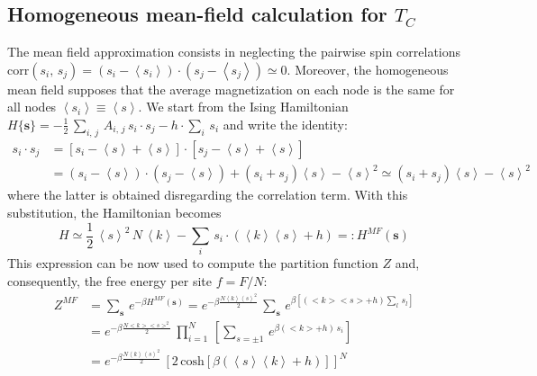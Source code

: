 \subsection*{Homogeneous mean-field calculation for $T_C$ } \label{app:mean_field}
{\small
The mean field approximation consists in neglecting the pairwise spin correlations $
    \text{corr}(s_i,\,s_j) = (s_i - \left\langle s_i \right \rangle)\cdot (s_j - \left\langle s_j \right \rangle)\simeq 0 $.
Moreover, the homogeneous mean field supposes that the average magnetization on each node is the same for all nodes $\left\langle s_i\right\rangle \equiv \left \langle s \right \rangle$. We start from the Ising Hamiltonian $H\{\mathbf{s}\} = -\frac{1}{2}\, \sum_{i,\,j}\,A_{i,\,j}\,s_i\cdot s_j - h\cdot\sum_{i}\,s_i$ and write the identity: 
\begin{align*}
    s_i\cdot s_j &= [s_i - \left\langle s \right \rangle + \left\langle s \right \rangle]\cdot [s_j - \left\langle s \right \rangle + \left\langle s \right \rangle] \\
    &= (s_i - \left\langle s \right \rangle)\cdot (s_j-\left\langle s \right \rangle) + (s_i + s_j) \left\langle s \right \rangle - \left\langle s \right \rangle^2 \simeq (s_i + s_j) \left\langle s \right \rangle - \left\langle s \right \rangle^2
\end{align*} where the latter is obtained disregarding the correlation term. With this substitution, the Hamiltonian becomes 
\begin{equation*}
    H \simeq\frac{1}{2}\,\left\langle s \right \rangle^2\,N\,\left\langle k \right \rangle - \sum_i\,s_i\cdot (\left\langle k \right \rangle\left\langle s \right \rangle + h)=: H^{MF}(\mathbf{s})
\end{equation*}
This expression can be now used to compute the partition function $Z$ and, consequently, the free energy per site $f= F/N$:
\begin{align*}
    Z^{MF} &= \sum_{\mathbf{s}}\, e^{-\beta H^{MF}(\mathbf{s})} = e^{-\beta \frac{N \left\langle k \right \rangle\left\langle s \right \rangle^2}{2}}\, \sum_{\mathbf{s}}\, e^{\beta\left[(<k><s> + h)\sum_l\,s_l\right]} \\
    &= e^{-\beta \frac{N <k><s>^2}{2}}\, \prod_{i=1}^{N}\, \left[ \sum_{s = \pm 1}\, e^{\beta(<k>+h)\,s_i} \right] \\
    &= e^{-\beta \frac{N \left\langle k \right \rangle\left\langle s \right \rangle^2}{2}}\,\left[2\,\text{cosh}\left[\beta(\left\langle s \right \rangle\left\langle k \right \rangle+h)\right]\right]^N \\

\end{align*}}
